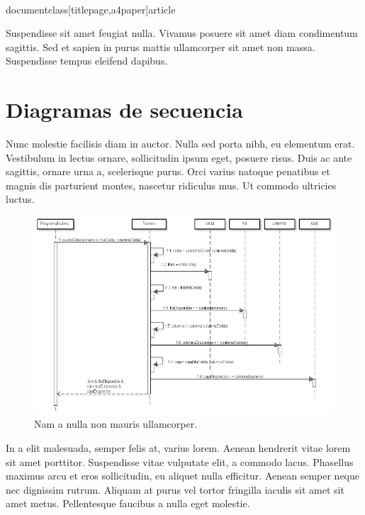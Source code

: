 \\documentclass[titlepage,a4paper]{article}
\begin{document}
Suspendisse sit amet feugiat nulla. Vivamus posuere sit amet diam condimentum sagittis. Sed et sapien in purus mattis ullamcorper sit amet non massa. Suspendisse tempus eleifend dapibus.

\section{Diagramas de secuencia}\label{sec:diagramasdeclase}

Nunc molestie facilisis diam in auctor. Nulla sed porta nibh, eu elementum erat. Vestibulum in lectus ornare, sollicitudin ipsum eget, posuere risus. Duis ac ante sagittis, ornare urna a, scelerisque purus. Orci varius natoque penatibus et magnis dis parturient montes, nascetur ridiculus mus. Ut commodo ultricies luctus.

\begin{figure}[H]
\centering
\includegraphics[width=\textwidth]{SecuenciasDiagramas/diagrama_secuencia02.png}
\caption{\label{fig:seq02}Nam a nulla non mauris ullamcorper.}
\end{figure}

In a elit malesuada, semper felis at, varius lorem. Aenean hendrerit vitae lorem sit amet porttitor. Suspendisse vitae vulputate elit, a commodo lacus. Phasellus maximus arcu et eros sollicitudin, eu aliquet nulla efficitur. Aenean semper neque nec dignissim rutrum. Aliquam at purus vel tortor fringilla iaculis sit amet sit amet metus. Pellentesque faucibus a nulla eget molestie.
\end{document}
